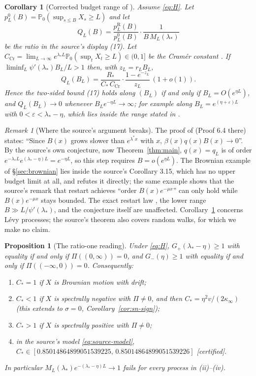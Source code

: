 \documentclass[11pt,a4paper]{article}
\newtheorem{corollary}[theorem]{Corollary}
\newtheorem{proposition}[theorem]{Proposition}
\theoremstyle{definition}
\theoremstyle{remark}
\newtheorem{remark}[theorem]{Remark}
\newcommand{\Pp}{\mathbb P}
\newcommand{\1}{\mathbf 1}
\newcommand{\kinf}{\kappa_\infty}
\newcommand{\status}[1]{\textsf{[#1]}}
\begin{document}
\begin{corollary}[Corrected budget range of {\cite[Theorem 3.14]{garcia}}]\label{cor:corrected}
Assume \eqref{eq:H}. Let $p^0_L(B)=\Pp_0(\sup_{s\le B}X_s\ge L)$ and let
\[
 Q_L(B)=\frac{p^{\mathrm R}_L(B)}{p^0_L(B)}\cdot\frac{1}{B\,M_L(\lambda_*)}
\]
be the ratio in the source's display (17). Let $C_{\mathrm{Cr}}=\lim_{L\to\infty}e^{\lambda_*L}\Pp_0(\sup_tX_t\ge L)\in(0,1]$ be the Cram\'er constant \cite{bertoindoney}. If $\liminf_L\psi'(\lambda_*)B_L/L>1$ then, with $z_L=r_LB_L$,
\begin{equation}\label{eq:corrected}
 Q_L(B_L)=\frac{R_*}{C_*\,C_{\mathrm{Cr}}}\cdot\frac{1-e^{-z_L}}{z_L}\,(1+o(1)).
\end{equation}
Hence the two-sided bound (17) holds along $(B_L)$ if and only if $B_L=O(e^{\eta L})$, and $Q_L(B_L)\to0$ whenever $B_Le^{-\eta L}\to\infty$; for example along $B_L=e^{(\eta+\varepsilon)L}$ with $0<\varepsilon<\lambda_*-\eta$, which lies inside the range stated in \cite[Theorem 3.14]{garcia}.
\end{corollary}

\begin{remark}[Where the source's argument breaks]\label{rem:proof64}
The proof of \cite[Theorem 3.14]{garcia} (Proof 6.4 there) states: ``Since $B(x)$ grows slower than $e^{\lambda^{*}x}$ with $x$, $\beta(x)q(x)B(x)\to 0$''. By the source's own conjecture, now Theorem~\ref{thm:main}, $q(x)=q_L$ is of order $e^{-\lambda_*L}e^{(\lambda_*-\eta)L}=e^{-\eta L}$, so this step requires $B=o(e^{\eta L})$. The Brownian example of \S\ref{sec:brownian} lies inside the source's Corollary 3.15, which has no upper budget limit at all, and refutes it directly; the same example shows that the source's remark that restart achieves ``order $B(x)e^{-\mu x}$'' can only hold while $B(x)e^{-\mu x}$ stays bounded. The exact restart law \cite[Lemma 6.2]{garcia}, the lower range $B\gg L/\psi'(\lambda_*)$, and the conjecture itself are unaffected. Corollary~\ref{cor:corrected} concerns L\'evy processes; the source's theorem also covers random walks, for which we make no claim.
\end{remark}

\begin{proposition}[The ratio-one reading]\label{prop:ratioone}
Under \eqref{eq:H}, $G_+(\lambda_*-\eta)\ge1$ with equality if and only if $\Pi((0,\infty))=0$, and $G_-(\eta)\ge1$ with equality if and only if $\Pi((-\infty,0))=0$. Consequently:
\begin{enumerate}[label=(\roman*)]
\item $C_*=1$ if $X$ is Brownian motion with drift;
\item $C_*<1$ if $X$ is spectrally negative with $\Pi\ne0$, and then $C_*=\eta^2v/(2\kinf)$ (this extends to $\sigma=0$, Corollary~\ref{cor:sn-sign});
\item $C_*>1$ if $X$ is spectrally positive with $\Pi\ne0$;
\item in the source's model \eqref{eq:source-model}, $C_*\in[0.85014864899051539225,\,0.85014864899051539226]$ \status{certified}.
\end{enumerate}
In particular $M_L(\lambda_*)e^{-(\lambda_*-\eta)L}\to1$ fails for every process in (ii)--(iv).
\end{proposition}
\end{document}
